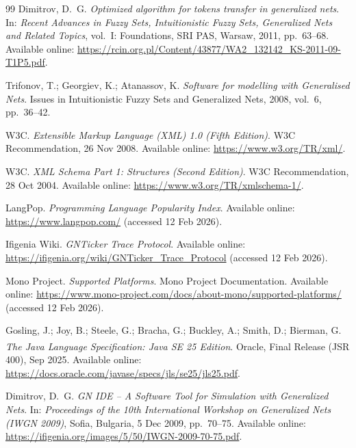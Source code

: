 \begin{thebibliography}{99}
Dimitrov, D.~G.
\newblock \emph{Optimized algorithm for tokens transfer in generalized nets}.
\newblock In: \emph{Recent Advances in Fuzzy Sets, Intuitionistic Fuzzy Sets, Generalized Nets and Related Topics}, vol.~I: Foundations, SRI PAS, Warsaw, 2011, pp.~63--68.
\newblock Available online: \url{https://rcin.org.pl/Content/43877/WA2_132142_KS-2011-09-T1P5.pdf}.

Trifonov, T.; Georgiev, K.; Atanassov, K.
\newblock \emph{Software for modelling with Generalised Nets}.
\newblock Issues in Intuitionistic Fuzzy Sets and Generalized Nets, 2008, vol.~6, pp.~36--42.


W3C.
\newblock \emph{Extensible Markup Language (XML) 1.0 (Fifth Edition)}.
\newblock W3C Recommendation, 26 Nov 2008.
\newblock Available online: \url{https://www.w3.org/TR/xml/}.

W3C.
\newblock \emph{XML Schema Part 1: Structures (Second Edition)}.
\newblock W3C Recommendation, 28 Oct 2004.
\newblock Available online: \url{https://www.w3.org/TR/xmlschema-1/}.

LangPop.
\newblock \emph{Programming Language Popularity Index}.
\newblock Available online: \url{https://www.langpop.com/} (accessed 12 Feb 2026).

Ifigenia Wiki.
\newblock \emph{GNTicker Trace Protocol}.
\newblock Available online: \url{https://ifigenia.org/wiki/GNTicker_Trace_Protocol} (accessed 12 Feb 2026).

Mono Project.
\newblock \emph{Supported Platforms}.
\newblock Mono Project Documentation.
\newblock Available online: \url{https://www.mono-project.com/docs/about-mono/supported-platforms/} (accessed 12 Feb 2026).

Gosling, J.; Joy, B.; Steele, G.; Bracha, G.; Buckley, A.; Smith, D.; Bierman, G.
\newblock \emph{The Java\textsuperscript{\textregistered} Language Specification: Java SE 25 Edition}.
\newblock Oracle, Final Release (JSR 400), Sep 2025.
\newblock Available online: \url{https://docs.oracle.com/javase/specs/jls/se25/jls25.pdf}.


Dimitrov, D.~G.
\newblock \emph{GN IDE -- A Software Tool for Simulation with Generalized Nets}.
\newblock In: \emph{Proceedings of the 10th International Workshop on Generalized Nets (IWGN 2009)}, Sofia, Bulgaria, 5 Dec 2009, pp.~70--75.
\newblock Available online: \url{https://ifigenia.org/images/5/50/IWGN-2009-70-75.pdf}.


\end{thebibliography}

